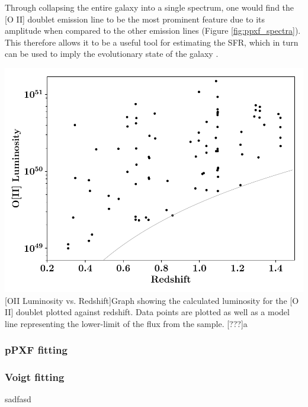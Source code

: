 \documentclass[12pt, twocolumn]{revtex4}    %
\begin{document}
Through collapsing the entire galaxy into a single spectrum, one would find the [O II] doublet emission line to be the most prominent feature due to its amplitude when compared to the other emission lines (Figure \ref{fig:ppxf_spectra}). This therefore allows it to be a useful tool for estimating the SFR, which in turn can be used to imply the evolutionary state of the galaxy \citep{maddox_oxygen}.



\begin{center}
\includegraphics[width=1.0\linewidth]{data/o_ii_luminosity_vs_redshift}
[OII Luminosity vs. Redshift]{Graph showing the calculated luminosity for the [O II] doublet plotted against redshift. Data points are plotted as well as a model line representing the lower-limit of the flux from the sample. [???]a}
\label{fig:oiiluminosity_redshift}
\end{center}

\subsubsection{pPXF fitting}

\subsubsection{Voigt fitting}

sadfasd
\end{document}
